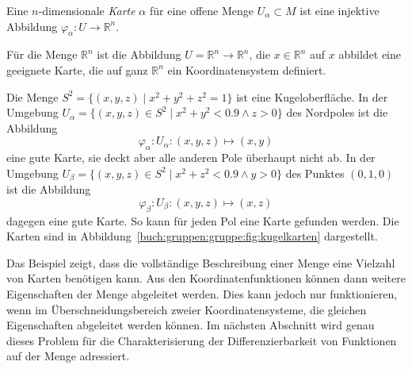 \begin{definition}[Karte]
\label{buch:gruppen:gruppe:def:karte}
Eine $n$-dimensionale {\em Karte} $\alpha$ für eine offene Menge
%
$U_\alpha\subset M$ ist eine injektive Abbildung
$\varphi_\alpha\colon U\to \mathbb{R}^n$.
\end{definition}

\begin{beispiel}
Für die Menge $\mathbb{R}^n$ ist die Abbildung
$U=\mathbb{R}^n\to \mathbb{R}^n$, die $x\in\mathbb{R}^n$ auf
$x$ abbildet eine geeignete Karte, die auf ganz $\mathbb{R}^n$ ein
Koordinatensystem definiert.
\end{beispiel}

\begin{beispiel}
\label{buch:gruppen:gruppe:bsp:kugel}

Die Menge $S^2 = \{(x,y,z)\mid x^2+y^2+z^2=1\}$ ist eine Kugeloberfläche.
In der Umgebung $U_\alpha = \{(x,y,z)\in S^2\mid x^2+y^2<0.9\wedge z>0\}$
des Nordpoles ist die Abbildung
\[
\varphi_\alpha
\colon
U_\alpha
:
(x,y,z)\mapsto (x,y)
\]
eine gute Karte, sie deckt aber alle anderen Pole überhaupt nicht ab.
In der Umgebung $U_\beta = \{(x,y,z)\in S^2\mid x^2+z^2<0.9\wedge y>0\}$
des Punktes $(0,1,0)$ ist die Abbildung
\[
\varphi_\beta
\colon
U_\beta
:
(x,y,z)\mapsto (x,z)
\]
dagegen eine gute Karte.
So kann für jeden Pol eine Karte gefunden werden.
Die Karten sind in Abbildung~\ref{buch:gruppen:gruppe:fig:kugelkarten}
dargestellt.
\end{beispiel}

Das Beispiel zeigt, dass die vollständige Beschreibung einer Menge
eine Vielzahl von Karten benötigen kann.
Aus den Koordinatenfunktionen können dann weitere Eigenschaften der
Menge abgeleitet werden.
Dies kann jedoch nur funktionieren, wenn im Überschneidungsbereich
zweier Koordinatensysteme, die gleichen Eigenschaften abgeleitet
werden können.
Im nächsten Abschnitt wird genau dieses Problem für die
Charakterisierung der Differenzierbarkeit von Funktionen auf der
Menge adressiert.

%
%
